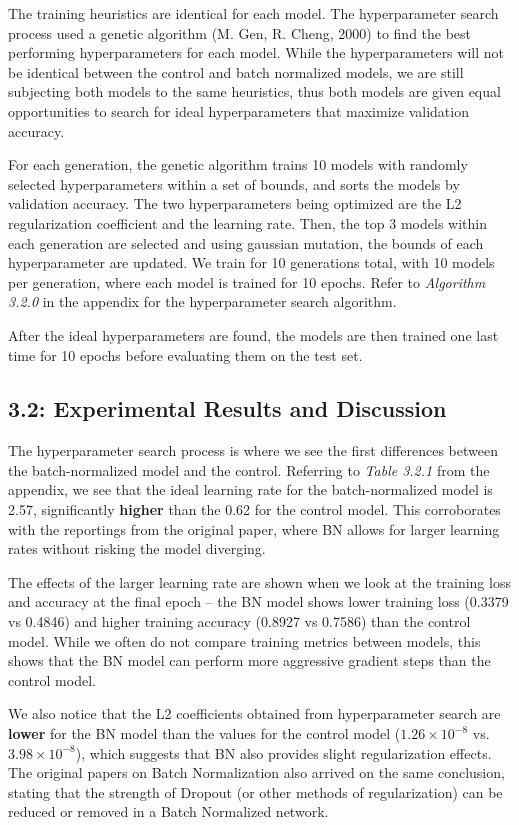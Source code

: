 \documentclass{article}
\begin{document}
\begin{multicols}{2}
The training heuristics are identical for each model. The hyperparameter search process used 
a genetic algorithm (M. Gen, R. Cheng, 2000) to find the best performing 
hyperparameters for each model. While the hyperparameters will not be identical
between the control and batch normalized models, we are still subjecting both
models to the same heuristics, thus both models are given equal opportunities 
to search for ideal hyperparameters that maximize validation accuracy.

For each generation, the genetic algorithm trains 10 models with randomly 
selected hyperparameters within a set of bounds, and sorts the models
by validation accuracy. The two hyperparameters being optimized are the 
L2 regularization coefficient and the learning rate. Then, the top 3 models
within each generation are selected and using gaussian mutation, the bounds of each hyperparameter 
are updated. We train for 10 generations total, with 10 models per generation, 
where each model is trained for 10 epochs. Refer to \textit{Algorithm 3.2.0}
in the appendix for the hyperparameter search algorithm.

After the ideal hyperparameters are found, the models are then trained 
one last time for 10 epochs before evaluating them on the test set. 

\subsection*{3.2: Experimental Results and Discussion}

The hyperparameter search process is where we see the first differences
between the batch-normalized model and the control. Referring to \textit{Table 3.2.1} 
from the appendix, we see that the ideal learning rate for the batch-normalized 
model is 2.57, significantly \textbf{higher} than the 0.62 for the control model. This 
corroborates with the reportings from the original paper, where BN allows for 
larger learning rates without risking the model diverging. 

The effects of the larger learning rate are shown when we look at the training
loss and accuracy at the final epoch -- the BN model shows lower training
loss (0.3379 vs 0.4846) and higher training accuracy (0.8927 vs 0.7586) than 
the control model. While we often do not compare training metrics between models,
this shows that the BN model can perform more aggressive gradient steps than 
the control model.

We also notice that the L2 coefficients obtained from hyperparameter 
search are \textbf{lower} for the BN model than the values for the control model 
($1.26 \times 10^{-8}$ vs. $3.98 \times 10^{-8}$), which suggests that BN also 
provides slight regularization effects. The original papers on Batch Normalization
also arrived on the same conclusion, stating that the strength of Dropout (or 
other methods of regularization) can be reduced or removed in a Batch Normalized 
network.



\end{multicols}
\end{document}
